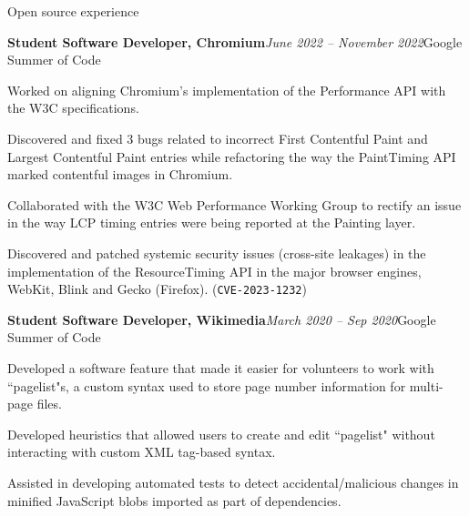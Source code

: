 \documentclass{resume} %
\begin{document}
\begin{rSection}{Open source experience}
%
\begin{rSubsection}{\bf Student Software Developer, Chromium}{\em June 2022 -- November 2022}{Google Summer of Code}{}
\item Worked on aligning Chromium's implementation of the Performance API with the W3C specifications.
\item Discovered and fixed 3 bugs related to incorrect First Contentful Paint and Largest Contentful Paint entries while refactoring the way the PaintTiming API marked contentful images in Chromium.
\item Collaborated with the W3C Web Performance Working Group to rectify an issue in the way LCP timing entries were being reported at the Painting layer.
\item Discovered and patched systemic security issues (cross-site leakages) in the implementation of the ResourceTiming API in the major browser engines, WebKit, Blink and Gecko (Firefox). (\texttt{CVE-2023-1232})
\end{rSubsection}
\begin{rSubsection}{ \bf Student Software Developer, Wikimedia}{\em March 2020 -- Sep 2020}{Google Summer of Code}{}
\item Developed a software feature that made it easier for volunteers to work with ``pagelist"s, a custom syntax used to store page number information for multi-page files.
\item Developed heuristics that allowed users to create and edit ``pagelist" without interacting with custom XML tag-based syntax.
\item Assisted in developing automated tests to detect accidental/malicious changes in minified JavaScript blobs imported as part of dependencies.
\end{rSubsection}
\end{rSection}
\end{document}
